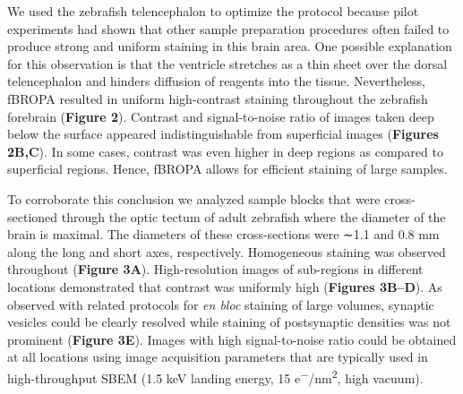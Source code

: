 \documentclass{article}
\begin{document}
\noindent We used the zebrafish telencephalon to optimize the protocol because pilot experiments had shown that other sample preparation procedures often failed to produce strong and uniform staining in this brain area. One possible explanation for this observation is that the ventricle stretches as a thin sheet over the dorsal telencephalon and hinders diffusion of reagents into the tissue. Nevertheless, fBROPA resulted in uniform high-contrast staining throughout the zebrafish forebrain (\textbf{Figure 2}). Contrast and signal-to-noise ratio of images taken deep below the surface appeared indistinguishable from superficial images (\textbf{Figures 2B,C}). In some cases, contrast was even higher in deep regions as compared to superficial regions. Hence, fBROPA allows for efficient staining of large samples.

To corroborate this conclusion we analyzed sample blocks that were cross-sectioned through the optic tectum of adult zebrafish where the diameter of the brain is maximal. The diameters of these cross-sections were ∼1.1 and 0.8 mm along the long and short axes, respectively. Homogeneous staining was observed throughout (\textbf{Figure 3A}). High-resolution images of sub-regions in different locations demonstrated that contrast was uniformly high (\textbf{Figures 3B–D}). As observed with related protocols for \emph{en bloc} staining of large volumes, synaptic vesicles could be clearly resolved while staining of postsynaptic densities was not prominent (\textbf{Figure 3E}). Images with high signal-to-noise ratio could be obtained at all locations using image acquisition parameters that are typically used in high-throughput SBEM (1.5 keV landing energy, 15 e\textsuperscript{−}/nm\textsuperscript{2}, high vacuum).
\end{document}
